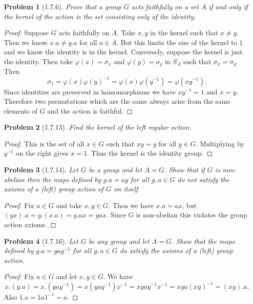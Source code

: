 \documentclass{article}
\newtheorem{problem}{Problem}
\begin{document}
\begin{problem}[1.7.6]
Prove that a group $G$ acts faithfully on a set $A$ if and only if the kernel of the action is the set consisting only of the identity.
\end{problem}
\begin{proof}
Suppose $G$ acts faithfully on $A$. Take $x,y$ in the kernel such that $x \neq y$. Then we know $x.a \neq y.a$ for all $a \in A$. But this limits the size of the kernel to $1$ and we know the identity is in the kernel. Conversely, suppose the kernel is just the identity. Then take $\varphi(x) = \sigma_x$ and $\varphi(y) = \sigma_y$ in $S_A$ such that $\sigma_x = \sigma_y$. Then
\[
\sigma_1 = \varphi(x)\varphi(y)^{-1} = \varphi(x)\varphi(y^{-1}) = \varphi(xy^{-1}).
\]
Since identities are preserved in homomorphisms we have $xy^{-1} = 1$ and $x = y$. Therefore two permutations which are the same always arise from the same elements of $G$ and the action is faithful.
\end{proof}

\begin{problem}[1.7.13]
Find the kernel of the left regular action.
\end{problem}
\begin{proof}
This is the set of all $x \in G$ such that $xy = y$ for all $y \in G$. Multiplying by $y^{-1}$ on the right gives $x = 1$. Thus the kernel is the identity group.
\end{proof}

\begin{problem}[1.7.14]
Let $G$ be a group and let $A = G$. Show that if $G$ is non-abelian then the maps defined by $g.a = ag$ for all $g,a \in G$ do \emph{not} satisfy the axioms of a (left) group action of $G$ on itself.
\end{problem}
\begin{proof}
Fix $a \in G$ and take $x,y \in G$. Then we have $x.a = ax$, but $(yx).a = y.(x.a) = y.ax = yax$. Since $G$ is non-abelian this violates the group action axioms.
\end{proof}

\begin{problem}[1.7.16]
\label{conj}
Let $G$ be any group and let $A = G$. Show that the maps defined by $g.a = gag^{-1}$ for all $g,a \in G$ \emph{do} satisfy the axioms of a (left) group action.
\end{problem}
\begin{proof}
Fix $a \in G$ and let $x,y \in G$. We have
\[
x.(y.a) = x.(yay^{-1}) = x(yay^{-1})x^{-1} = xyay^{-1}x^{-1} = xya(xy)^{-1} = (xy).a.
\]
Also $1.a = 1a1^{-1} = a$.
\end{proof}
\end{document}
